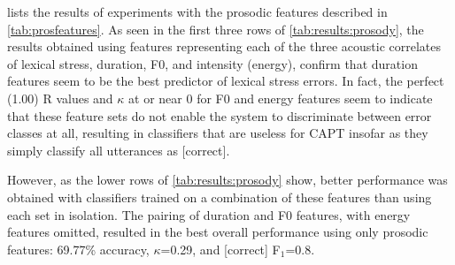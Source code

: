 \documentclass[a4paper]{article}
\begin{document}
		 lists the results of experiments with the prosodic features described in \cref{tab:prosfeatures}. As seen in the first three rows of \cref{tab:results:prosody}, the results obtained using features representing each of the three acoustic correlates of lexical stress, duration, F0, and intensity (energy), confirm that duration features seem to be the best predictor of lexical stress errors.%
		In fact, the perfect (1.00) R values and $\kappa$ at or near 0 for F0 and energy features seem to indicate that these feature sets do not enable the system to discriminate between error classes at all, resulting in classifiers that are useless for CAPT insofar as they simply classify all utterances as [correct].
		
		However, as the lower rows of \cref{tab:results:prosody} show, better performance was obtained with classifiers trained on a combination of these features than using each set in isolation. The pairing of duration and F0 features, with energy features omitted, resulted in the best overall performance using only prosodic features: 
		69.77\% accuracy, $\kappa$=0.29, and [correct] F$_1$=0.8.
		
		
		
\end{document}
